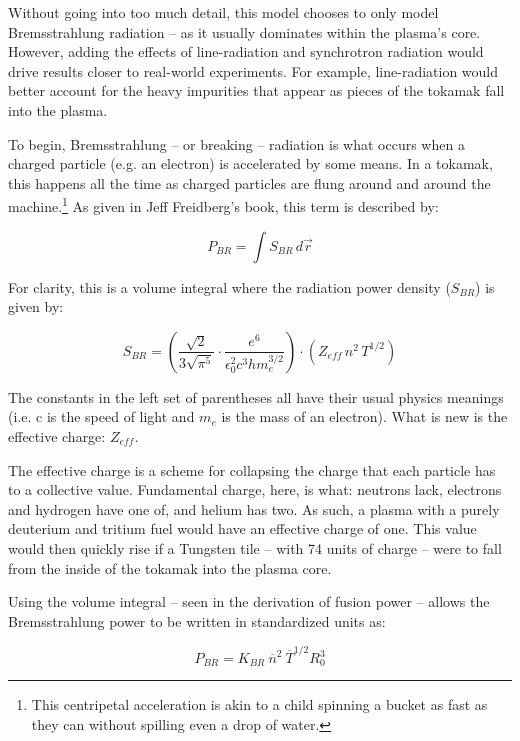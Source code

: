 Without going into too much detail, this model chooses to only model Bremsstrahlung radiation -- as it usually dominates within the plasma's core. However, adding the effects of line-radiation and synchrotron radiation would drive results closer to real-world experiments. For example, line-radiation would better account for the heavy impurities that appear as pieces of the tokamak fall into the plasma.

To begin, Bremsstrahlung -- or breaking -- radiation is what occurs when a charged particle (e.g. an electron) is accelerated by some means. In a tokamak, this happens all the time as charged particles are flung around and around the machine.\footnote{This centripetal acceleration is akin to a child spinning a bucket as fast as they can without spilling even a drop of water.} As given in Jeff Freidberg's book, this term is described by:

\begin{equation}
	P_{BR} = \int S_{BR} \, d \vec{r}
\end{equation}

For clarity, this is a volume integral where the radiation power density ($S_{BR}$) is given by:

\begin{equation}
	S_{BR} = \left( \frac{\sqrt{2}}{3 \sqrt{\pi^5}} \cdot \frac{e^6}{\epsilon_0^2 c^3 h m_e^{3/2}} \right) \cdot \left( Z_{eff} \, n^2 \, T^{1/2} \right)
\end{equation}

The constants in the left set of parentheses all have their usual physics meanings (i.e. c is the speed of light and $m_e$ is the mass of an electron). What is new is the effective charge: $Z_{eff}$.

The effective charge is a scheme for collapsing the charge that each particle has to a collective value. Fundamental charge, here, is what: neutrons lack, electrons and hydrogen have one of, and helium has two. As such, a plasma with a purely deuterium and tritium fuel would have an effective charge of one. This value would then quickly rise if a Tungsten tile -- with 74 units of charge -- were to fall from the inside of the tokamak into the plasma core.

Using the volume integral -- seen in the derivation of fusion power -- allows the Bremsstrahlung power to be written in standardized units as:

\begin{equation}
	\label{eq:pbr}
	P_{BR} = K_{BR} \ \overline n ^ 2 \ \overline T ^ {1/2} R_0^3 
\end{equation}


